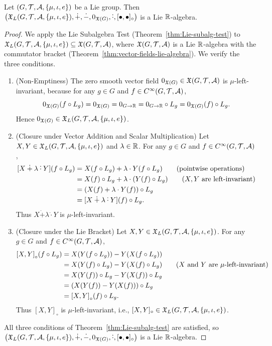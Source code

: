\documentclass[11pt,reqno]{amsart}
\newcommand{\pwplus}{\mathbin{\dot{+}}}
\newcommand{\pwminus}{\mathbin{\dot{-}}}
\newcommand{\pwcdot}{\mathbin{\dot{\cdot}}}
\begin{document}
\begin{Thm}
\label{thm:left-inv-lie-algebra}
Let $(G,\T,\A,\set{\mu,\iota,e})$ be a Lie group.
Then $\Br{\X_L(G,\T,\A,\set{\mu,\iota,e}),\pwplus,\pwminus,0_{\X(G)},\pwcdot,
[\bullet,\bullet]_\circ}$
is a Lie $\mathbb{R}$-algebra.
\end{Thm}
\begin{proof}
We apply the Lie Subalgebra Test (Theorem~\ref{thm:Lie-subalg-test})
to $\X_L(G,\T,\A,\set{\mu,\iota,e})\subseteq\X(G,\T,\A)$, where
$\mathfrak{X}(G,\mathcal{T},\mathcal{A})$ is a Lie $\mathbb{R}$-algebra with the commutator bracket
(Theorem~\ref{thm:vector-fields-lie-algebra}).
We verify the three conditions.

\begin{enumerate}
\item (Non-Emptiness)
The zero smooth vector field $0_{\mathfrak{X}(G)}\in\mathfrak{X}(G,\mathcal{T},\mathcal{A})$ is $\mu$-left-invariant,
because for any $g\in G$ and $f\in C^\infty(G,\mathcal{T},\mathcal{A})$,
\[
0_{\mathfrak{X}(G)}(f\circ L_g)=0_{\mathfrak{X}(G)}=0_{G\to\mathbb{R}}=0_{G\to\mathbb{R}}\circ L_g=0_{\mathfrak{X}(G)}(f)\circ L_g.
\]
Hence $0_{\X(G)}\in\X_L(G,\T,\A,\set{\mu,\iota,e})$.

\item (Closure under Vector Addition and Scalar Multiplication)
Let $X,Y\in\X_L(G,\T,\A,\set{\mu,\iota,e})$ and $\lambda\in\mathbb{R}$.
For any $g\in G$ and $f\in C^\infty(G,\mathcal{T},\mathcal{A})$,
\[
\begin{aligned}
\FUNC{X\pwplus\lambda\pwcdot Y}{f\circ L_g}
&=X(f\circ L_g)+\lambda\cdot Y(f\circ L_g)
\qquad\text{(pointwise operations)}\\
&=X(f)\circ L_g+\lambda\cdot\Br{Y(f)\circ L_g}
\qquad\text{($X,Y$ are left-invariant)}\\
&=\Br{X(f)+\lambda\cdot Y(f)}\circ L_g\\
&=\FUNC{X\pwplus\lambda\pwcdot Y}{f}\circ L_g.
\end{aligned}
\]
Thus $X\pwplus\lambda\pwcdot Y$ is $\mu$-left-invariant.

\item (Closure under the Lie Bracket)
Let $X,Y\in\X_L(G,\T,\A,\set{\mu,\iota,e})$.
For any $g\in G$ and $f\in C^\infty(G,\mathcal{T},\mathcal{A})$,
\[
\begin{aligned}
\FUNC[\circ]{X,Y}{f\circ L_g}
&=X(Y(f\circ L_g))-Y(X(f\circ L_g))\\
&=X(Y(f)\circ L_g)-Y(X(f)\circ L_g)
\qquad\text{($X$ and $Y$ are $\mu$-left-invariant)}\\
&=X(Y(f))\circ L_g-Y(X(f))\circ L_g\\
&=\Br{X(Y(f))-Y(X(f))}\circ L_g\\
&=\FUNC[\circ]{X,Y}{f}\circ L_g.
\end{aligned}
\]
Thus $[X,Y]_\circ$ is $\mu$-left-invariant, i.e.,
$[X,Y]_\circ\in\X_L(G,\T,\A,\set{\mu,\iota,e})$.
\end{enumerate}

All three conditions of Theorem~\ref{thm:Lie-subalg-test} are satisfied,
so
$\Br{\X_L(G,\T,\A,\set{\mu,\iota,e}),\pwplus,\pwminus,0_{\X(G)},\pwcdot,
[\bullet,\bullet]_\circ}$
is a Lie $\mathbb{R}$-algebra.
\end{proof}
\end{document}
